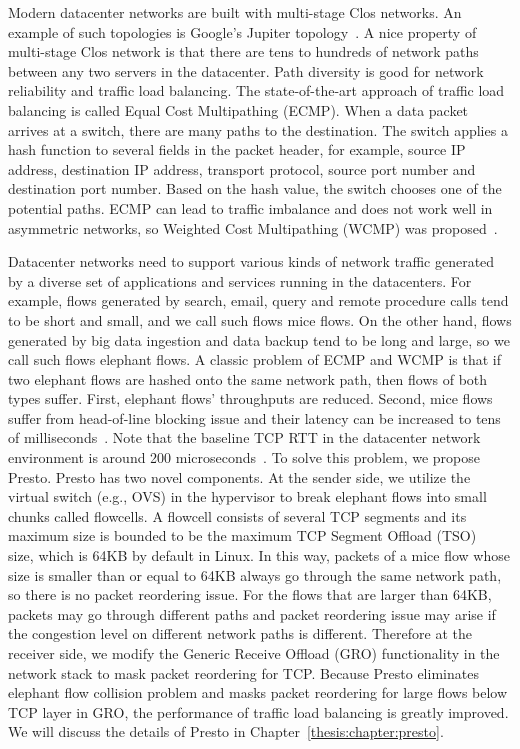 Modern datacenter networks are built with multi-stage Clos networks. 
An example of such topologies is Google's Jupiter topology~\cite{singh2015jupiter}. 
A nice property of multi-stage Clos network is that there are tens to hundreds of 
network paths between any two servers in the datacenter. Path diversity is good for network 
reliability and traffic load balancing. The state-of-the-art approach of traffic load balancing 
is called Equal Cost Multipathing (ECMP). When a data packet arrives at a switch, 
there are many paths to the destination. The switch applies a hash function to several 
fields in the packet header, for example, source IP address, destination IP address, 
transport protocol, source port number and destination port number. Based on the hash value, 
the switch chooses one of the potential paths. ECMP can lead to traffic imbalance and 
does not work well in asymmetric networks, so Weighted Cost Multipathing (WCMP) was proposed~\cite{wcmp}.

Datacenter networks need to support various kinds of network traffic generated by 
a diverse set of applications and services running in the datacenters. For example, flows generated 
by search, email, query and remote procedure calls tend to be short and small, and we call such flows mice flows. 
On the other hand, flows generated by big data ingestion and data backup tend to be long and large, 
so we call such flows elephant flows. A classic problem of ECMP and WCMP is that if two elephant flows 
are hashed onto the same network path, then flows of both types suffer. First, elephant flows' throughputs are reduced. 
Second, mice flows suffer from head-of-line blocking issue and their latency can be increased to 
tens of milliseconds~\cite{alizadeh2012less}. 
Note that the baseline TCP RTT in the datacenter network environment is around 200 microseconds~\cite{he2016ac}. 
To solve this problem, we propose Presto. Presto has two novel components. At the sender side, 
we utilize the virtual switch (e.g., OVS) in the hypervisor to break elephant flows into small chunks 
called flowcells. A flowcell consists of several TCP segments and its maximum size is bounded to be the 
maximum TCP Segment Offload (TSO)~\cite{tcp-segment-offload} size, 
which is 64KB by default in Linux. In this way, packets of a mice flow whose size 
is smaller than or equal to 64KB always go through the same network path, so there is no packet reordering issue. 
For the flows that are larger than 64KB, packets may go through different paths and packet reordering 
issue may arise if the congestion level on different network paths is different. 
Therefore at the receiver side, we modify the Generic Receive Offload (GRO) functionality in the network stack to 
mask packet reordering for TCP. Because Presto eliminates elephant flow collision problem and 
masks packet reordering for large flows below TCP layer in GRO, the performance of 
traffic load balancing is greatly improved.
We will discuss the details of Presto in Chapter~\ref{thesis:chapter:presto}.


